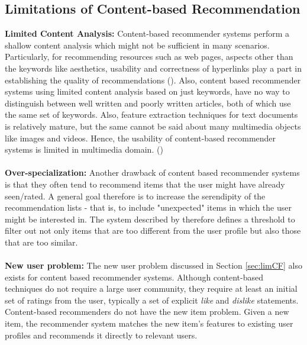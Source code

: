 \subsection{Limitations of Content-based Recommendation}
\textbf{Limited Content Analysis:} Content-based recommender systems perform a shallow content analysis which might not be sufficient in many scenarios. Particularly, for recommending resources such as web pages, aspects other than the keywords like aesthetics, usability and correctness of hyperlinks play a part in establishing the quality of recommendations (\cite{jannach}).
Also, content based recommender systems using limited content analysis based on just keywords, have no way to distinguish between well written and poorly written articles, both of which use the same set of keywords. 
Also, feature extraction techniques for text documents is relatively mature, but the same cannot be said about many multimedia objects like images and videos.
Hence, the usability of content-based recommender systems is limited in multimedia domain. (\cite{adom2005})\\
\\
\textbf{Over-specialization:}  Another drawback of content based recommender systems is that they often tend to recommend items that the user might have already seen/rated. 
A general goal therefore is to increase the serendipity of the recommendation lists - that is, to include "unexpected" items in which the user might be interested in.
The system described by \cite{billsus} therefore defines a threshold to filter out not only items that are too different from the user profile but also those that are too similar.\\
\\
\textbf{New user problem:} The new user problem discussed in Section \ref{sec:limCF} also exists for content based recommender systems.
Although content-based techniques do not require a large user community, they require at least an initial set of ratings from the user, typically a set of explicit \textit{like} and \textit{dislike} statements.
Content-based recommenders do not have the new item problem. 
Given a new item, the recommender system matches the new item's features to existing user profiles and recommends it directly to relevant users.

